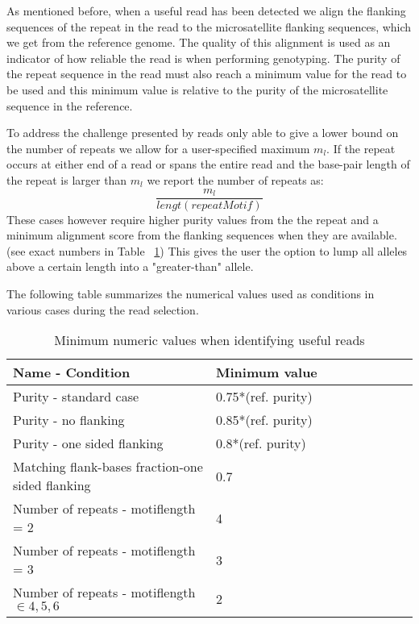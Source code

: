 \documentclass{bioinfo}
\begin{document}
    As mentioned before, when a useful read has been detected we align the flanking sequences of the repeat in the read to the microsatellite flanking sequences, which we get from the reference genome. The quality of this alignment is used as an indicator of how reliable the read is when performing genotyping. The purity of the repeat sequence in the read must also reach a minimum value for the read to be used and this minimum value is relative to the purity of the microsatellite sequence in the reference.
    
    To address the challenge presented by reads only able to give a lower bound on the number of repeats we allow for a user-specified maximum $m_l$. If the repeat occurs at either end of a read or spans the entire read and the base-pair length of the repeat is larger than $m_l$ we report the number of repeats as:
    \begin{equation}
        \frac{m_l}{lengt(repeatMotif)}
    \end{equation}
    These cases however require higher purity values from the the repeat and a minimum alignment score from the flanking sequences when they are available.(see exact numbers in Table ~\ref{table:numConditions}) 
    This gives the user the option to lump all alleles above a certain length into a "greater-than" allele.
    
    The following table summarizes the numerical values used as conditions in various cases during the read selection.
    \begin{center}
        \begin{table}[H]
            \caption{Minimum numeric values when identifying useful reads}
            \begin{tabular}{p{0.5\linewidth}|p{0.5\linewidth}}
                \hline
                \textbf{Name - Condition} & \textbf{Minimum value} \\ \hline
                Purity - standard case & 0.75*(ref. purity) \\ \hline
                Purity - no flanking & 0.85*(ref. purity) \\ \hline
                Purity - one sided flanking & 0.8*(ref. purity) \\ \hline
                Matching flank-bases fraction-one sided flanking & 0.7 \\ \hline
                Number of repeats - motiflength = 2 & 4 \\ \hline
                Number of repeats - motiflength = 3 & 3 \\ \hline
                Number of repeats - motiflength $\in {4,5,6}$ &  2\\ 
                \hline
            \end{tabular}
            \label{table:numConditions}
        \end{table}
    \end{center}
    
\end{document}
